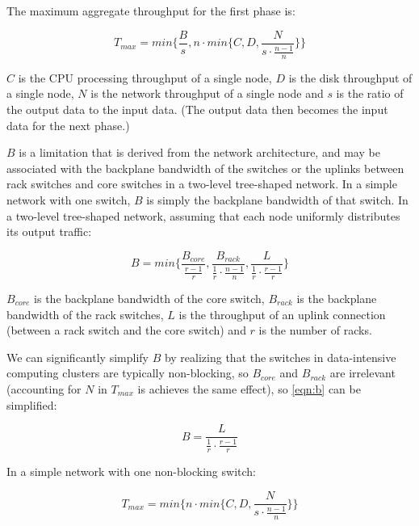 \documentclass{acm_proc_article-sp}
\begin{document}
The maximum aggregate throughput for the first phase is:

\begin{equation}
T_{max} = min\{\frac{ B }{ s }, n \cdot min\{C, D, \frac{ N }{ s \cdot \frac{n-1}{n} }\}\}
\label{eqn:tmax}
\end{equation}

$C$ is the CPU processing throughput of a single node, $D$ is the disk throughput of a single node, $N$ is the network throughput of a single node and $s$ is the ratio of the output data to the input data. (The output data then becomes the input data for the next phase.)

$B$ is a limitation that is derived from the network architecture, and may be associated with the backplane bandwidth of the switches or the uplinks between rack switches and core switches in a two-level tree-shaped network. In a simple network with one switch, $B$ is simply the backplane bandwidth of that switch. In a two-level tree-shaped network, assuming that each node uniformly distributes its output traffic:

\begin{equation}
B = min\{\frac{ B_{core} }{ \frac{r-1}{r} }, \frac{ B_{rack} }{ \frac{1}{r} \cdot \frac{n-1}{n} }, \frac{ L }{ \frac{1}{r} \cdot \frac{r-1}{r} }\}
\label{eqn:b}
\end{equation}

$B_{core}$ is the backplane bandwidth of the core switch, $B_{rack}$ is the backplane bandwidth of the rack switches, $L$ is the throughput of an uplink connection (between a rack switch and the core switch) and $r$ is the number of racks.

We can significantly simplify $B$ by realizing that the switches in data-intensive computing clusters are typically non-blocking, so $B_{core}$ and $B_{rack}$ are irrelevant (accounting for $N$ in $T_{max}$ is achieves the same effect), so \ref{eqn:b} can be simplified:

\begin{equation}
B = \frac{ L }{ \frac{1}{r} \cdot \frac{r-1}{r} }
\label{eqn:bnonblocking}
\end{equation}

In a simple network with one non-blocking switch:

\begin{equation}
T_{max} = min\{n \cdot min\{C, D, \frac{ N }{ s \cdot \frac{n-1}{n} }\}\}
\label{eqn:tmaxsingleswitch}
\end{equation}
\end{document}
